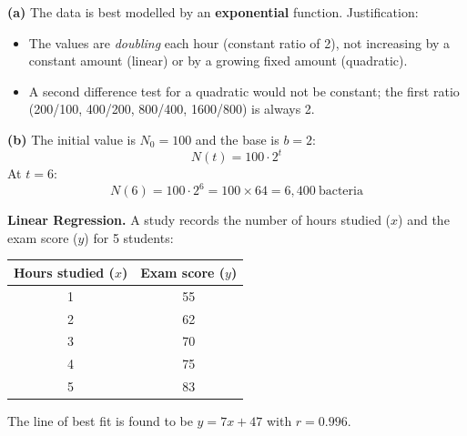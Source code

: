 \documentclass[addpoints]{exam}
\begin{document}
\begin{questions}

\begin{solution}
\textbf{(a)} The data is best modelled by an \textbf{exponential} function. Justification:
\begin{itemize}
    \item The values are \textit{doubling} each hour (constant ratio of 2), not increasing by a constant amount (linear) or by a growing fixed amount (quadratic).
    \item A second difference test for a quadratic would not be constant; the first ratio (200/100, 400/200, 800/400, 1600/800) is always 2.
\end{itemize}

\textbf{(b)} The initial value is $N_0 = 100$ and the base is $b = 2$:
\[
N(t) = 100 \cdot 2^t
\]
At $t = 6$:
\[
N(6) = 100 \cdot 2^6 = 100 \times 64 = 6{,}400\ \text{bacteria}
\]
\end{solution}

\vspace{5mm}

\question[6]
\textbf{Linear Regression.}
A study records the number of hours studied ($x$) and the exam score ($y$) for 5 students:

\begin{center}
\begin{tabular}{@{}cc@{}}
\toprule
Hours studied ($x$) & Exam score ($y$) \\
\midrule
1 & 55 \\
2 & 62 \\
3 & 70 \\
4 & 75 \\
5 & 83 \\
\bottomrule
\end{tabular}
\end{center}

The line of best fit is found to be $y = 7x + 47$ with $r = 0.996$.

\end{questions}
\end{document}
